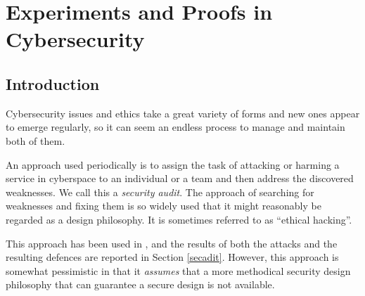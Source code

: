 
\chapter{Experiments and Proofs in Cybersecurity }\label{Ch4}
\section{Introduction}
\thispagestyle{empty}
\pagestyle{empty}
% 
% 
% 
% 


Cybersecurity issues and ethics take a great variety of forms and new ones appear to emerge regularly, so it can seem an endless process to manage and maintain both of them\cite{josang2005user}. 

An approach used periodically is to assign the task of attacking or harming a service in cyberspace to an individual or a team and then address the discovered weaknesses. We call this a {\em security audit}. The approach of searching for weaknesses and fixing them is so widely used that it might reasonably be regarded as a design philosophy. It is sometimes referred to as ``ethical hacking''.

This approach has been used in \cite{sheniar2018experiments}, and the results of both the attacks and the resulting defences are reported in Section \ref{secadit}. However, this approach is somewhat pessimistic in that it {\em assumes} that a more methodical security design philosophy that can guarantee a secure design is not available. 

